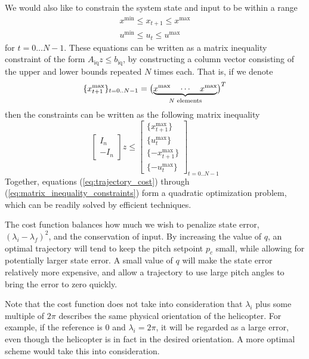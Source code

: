 We would also like to constrain the system state and input to be within a range
\begin{align}
    x^{\text{min}} \leq x_{t+1} \leq x^{\text{max}} \\
    u^{\text{min}} \leq u_t \leq u^{\text{max}}
\end{align}
for $t = 0...N-1$. These equations can be written as a matrix inequality constraint of the form $A_{\text{iq}} z \leq b_{\text{iq}}$, by constructing a column vector consisting of the upper and lower bounds repeated $N$ times each. That is, if we denote
\begin{equation}
    \{x_{t+1}^{\text{max}}\}_{t=0..N-1} =
      \bigl( \underbrace{%
      x^{\text{max}} \quad \cdots \quad x^{\text{max}}
    }_{\text{$N$~elements}} \bigr)^T
\end{equation}
then the constraints can be written as the following matrix inequality
\begin{equation}
    \label{eq:matrix_inequality_constraints}
    \begin{bmatrix} I_{n} \\ -I_{n} \end{bmatrix} z
    \leq
    \begin{bmatrix}
    \{x_{t+1}^{\text{max}}\} \\
    \{u_t^{\text{max}}\} \\
    \{-x_{t+1}^{\text{max}}\} \\
    \{-u_t^{\text{max}}\}
    \end{bmatrix}_{t=0..N-1}
\end{equation}
Together, equations (\ref{eq:trajectory_cost}) through (\ref{eq:matrix_inequality_constraints}) form a quadratic optimization problem, which can be readily solved by efficient techniques.

The cost function balances how much we wish to penalize state error, $(\lambda_i - \lambda_f)^2$, and the conservation of input. By increasing the value of $q$, an optimal trajectory will tend to keep the pitch setpoint $p_c$ small, while allowing for potentially larger state error. A small value of $q$ will make the state error relatively more expensive, and allow a trajectory to use large pitch angles to bring the error to zero quickly.

Note that the cost function does not take into consideration that $\lambda_i$ plus some multiple of $2\pi$ describes the same physical orientation of the helicopter. For example, if the reference is $0$ and $\lambda_i = 2\pi$, it will be regarded as a large error, even though the helicopter is in fact in the desired orientation. A more optimal scheme would take this into consideration.


